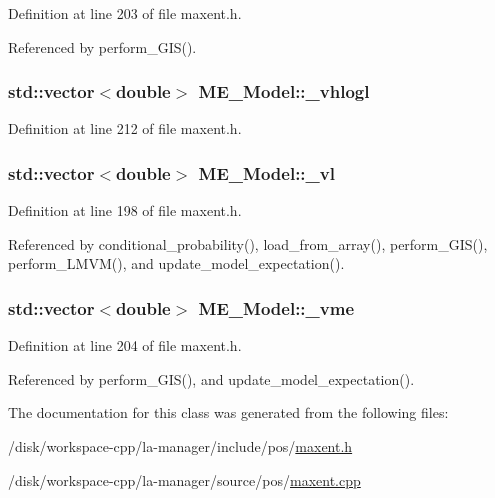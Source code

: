 Definition at line 203 of file maxent.h.

Referenced by perform\_\-GIS().\hypertarget{classME__Model_ff95546f6b66221b240b2f2316f55aac}{
\subsubsection[{\_\-vhlogl}]{\setlength{\rightskip}{0pt plus 5cm}std::vector$<$double$>$ {\bf ME\_\-Model::\_\-vhlogl}}}
\label{classME__Model_ff95546f6b66221b240b2f2316f55aac}




Definition at line 212 of file maxent.h.\hypertarget{classME__Model_a0dc1dcca7431b816b27c1d7c9f0379a}{
\subsubsection[{\_\-vl}]{\setlength{\rightskip}{0pt plus 5cm}std::vector$<$double$>$ {\bf ME\_\-Model::\_\-vl}}}
\label{classME__Model_a0dc1dcca7431b816b27c1d7c9f0379a}




Definition at line 198 of file maxent.h.

Referenced by conditional\_\-probability(), load\_\-from\_\-array(), perform\_\-GIS(), perform\_\-LMVM(), and update\_\-model\_\-expectation().\hypertarget{classME__Model_f73cc90b01028ab54527df94d6c8a123}{
\subsubsection[{\_\-vme}]{\setlength{\rightskip}{0pt plus 5cm}std::vector$<$double$>$ {\bf ME\_\-Model::\_\-vme}}}
\label{classME__Model_f73cc90b01028ab54527df94d6c8a123}




Definition at line 204 of file maxent.h.

Referenced by perform\_\-GIS(), and update\_\-model\_\-expectation().

The documentation for this class was generated from the following files:\begin{CompactItemize}
\item 
/disk/workspace-cpp/la-manager/include/pos/\hyperlink{maxent_8h}{maxent.h}\item 
/disk/workspace-cpp/la-manager/source/pos/\hyperlink{maxent_8cpp}{maxent.cpp}\end{CompactItemize}
